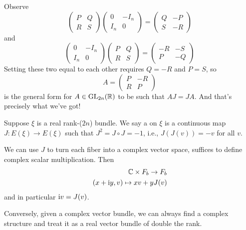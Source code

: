 \begin{node}
Observe
\begin{equation}
\begin{pmatrix}P & Q\\ R & S
\end{pmatrix}\begin{pmatrix}0 & -I_{n}\\I_{n} & 0
\end{pmatrix} = \begin{pmatrix} Q & -P\\ S & -R
\end{pmatrix}
\end{equation}
and
\begin{equation}
\begin{pmatrix}0 & -I_{n}\\I_{n} & 0
\end{pmatrix}
\begin{pmatrix}P & Q\\ R & S\end{pmatrix}
  = \begin{pmatrix} -R & -S\\ P & -Q \end{pmatrix}
\end{equation}
Setting these two equal to each other requires $Q=-R$ and $P=S$, so
\begin{equation}
A = \begin{pmatrix}P & -R\\R & P
\end{pmatrix}
\end{equation}
is the general form for $A\in\operatorname{GL}_{2n}(\mathbb{R})$ to be such that
$AJ=JA$. And that's precisely what we've got!
\end{node}

\begin{definition}
Suppose $\xi$ is a real rank-($2n$) bundle. We say a 
on $\xi$ is a continuous map $J\colon E(\xi)\to E(\xi)$ such that
$J^{2}=J\circ J=-1$, i.e., $J(J(v))=-v$ for all $v$.
\end{definition}

\begin{node}
We can use $J$ to turn each fiber into a complex vector space,
suffices to define complex scalar multiplication. Then
\begin{align}
\mathbb{C}\times F_{b}\to F_{b}\\
(x+\mathrm{i} y, v)\mapsto xv+yJ(v)\nonumber
\end{align}
and in particular $\mathrm{i} v=J(v)$.

Conversely, given a complex vector bundle, we can always find a
complex structure and treat it as a real vector bundle of double the rank.
\end{node}

